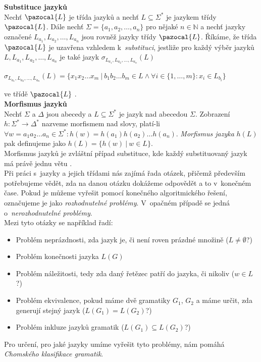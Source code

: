 \textbf{Substituce jazyků} \\
Nechť $\pazocal{L}$ je třída jazyků a nechť $L \subseteq \Sigma^*$ je jazykem třídy $\pazocal{L}$. Dále nechť 
$\Sigma = \{a_1, a_2, \dots, a_n\}$ 
pro nějaké $n\in \mathbb{N}$ a nechť jazyky označené $L_{a_1}, L_{a_2}, \dots, L_{a_n}$ jsou rovněž jazyky třídy 
$\pazocal{L}$. Říkáme, že třída $\pazocal{L}$ je uzavřena vzhledem k~\textit{substituci}, jestliže pro každý výběr jazyků 
$L, L_{a_1}, L_{a_2}, \dots, L_{a_n}$ je také jazyk 
$\sigma_{L_{a_1}, L_{a_2}, \dots, L_{a_n}}(L)$
\begin{center}
$\sigma_{L_{a_1}, L_{a_2}, \dots, L_{a_n}}(L) = \{x_1 x_2 \dots x_m \ | \ b_1 b_2 \dots b_m \in L \wedge \forall i \in 
\{1, \dots, m\}: x_i \in L_{b_i}\}$ 
\end{center}
ve třídě $\pazocal{L}$ \cite[str. 95]{TIN2013}. \\

\textbf{Morfismus jazyků} \\
Nechť $\Sigma$ a $\Delta$ jsou abecedy a $L \subseteq \Sigma^*$ je jazyk nad abecedou $\Sigma$. Zobrazení $h: \Sigma^* \rightarrow \Delta^*$ 
nazveme morfismem nad slovy, platí-li $\forall w = a_1 a_2 \dots a_n \in \Sigma^*: h(w) = h(a_1) h(a_2) \dots h(a_n)$. 
\textit{Morfismus jazyka} $h(L)$ pak definujeme jako $h(L) = \{h(w) \ | \ w \in L\}$. \\ 
Morfismus jazyků je zvláštní případ substituce, kde každý substituovaný jazyk má právě jednu větu \cite[str. 95]{TIN2013}. \\

Při práci s~jazyky a jejich třídami nás zajímá řada otázek, přičemž především potřebujeme vědět, zda na danou otázku dokážeme odpovědět a to 
v~konečném čase. Pokud je můžeme vyřešit pomocí konečného algoritmického řešení, označujeme je jako \textit{rozhodnutelné problémy}. 
V~opačném případě se jedná o~\textit{nerozhodnutelné problémy}. \\

Mezi tyto otázky se například řadí:
\begin{itemize}
\item Problém neprázdnosti, zda jazyk je, či není roven prázdné množině ($L \neq \emptyset$?)
\item Problém konečnosti jazyka $L(G)$
\item Problém náležitosti, tedy zda daný řetězec patří do jazyka, či nikoliv ($w \in L$?)
\item Problém ekvivalence, pokud máme dvě gramatiky $G_1$, $G_2$ a máme určit, zda generují stejný jazyk ($L(G_1) = L(G_2)$?)
\item Problém inkluze jazyků gramatik ($L(G_1) \subseteq L(G_2)$?)
\end{itemize}
\vspace*{\baselineskip}
Pro určení, pro jaké jazyky umíme vyřešit tyto problémy, nám pomáhá \textit{Chomského klasifikace gramatik}.

